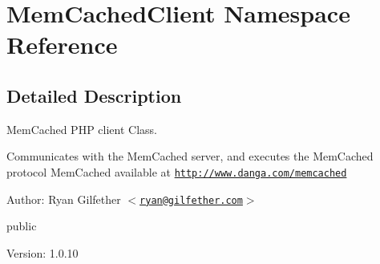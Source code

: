 \hypertarget{namespaceMemCachedClient}{
\section{MemCachedClient Namespace Reference}
\label{namespaceMemCachedClient}
}


\subsection{Detailed Description}
MemCached PHP client Class.

Communicates with the MemCached server, and executes the MemCached protocol MemCached available at \href{http://www.danga.com/memcached}{\tt http://www.danga.com/memcached}

\begin{Desc}
\item[Author:]Ryan Gilfether $<$\href{mailto:ryan@gilfether.com}{\tt ryan@gilfether.com}$>$\end{Desc}
public \begin{Desc}
\item[Version:]1.0.10 \end{Desc}


